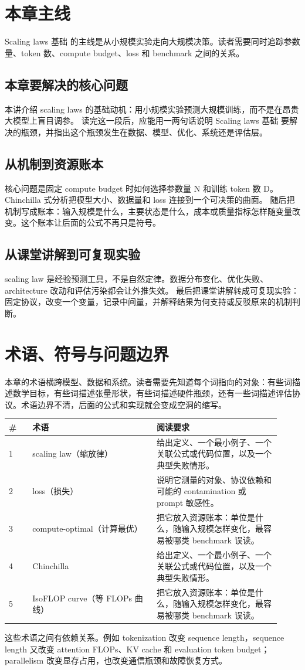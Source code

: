 \documentclass[a4paper]{article}
\begin{document}
\section{本章主线}
Scaling laws 基础 的主线是从小规模实验走向大规模决策。读者需要同时追踪参数量、token 数、compute budget、loss 和 benchmark 之间的关系。
\subsection{本章要解决的核心问题}
本讲介绍 scaling laws 的基础动机：用小规模实验预测大规模训练，而不是在昂贵大模型上盲目调参。
读完这一段后，应能用一两句话说明 Scaling laws 基础 要解决的瓶颈，并指出这个瓶颈发生在数据、模型、优化、系统还是评估层。
\subsection{从机制到资源账本}
核心问题是固定 compute budget 时如何选择参数量 N 和训练 token 数 D。Chinchilla 式分析把模型大小、数据量和 loss 连接到一个可决策的曲面。
随后把机制写成账本：输入规模是什么，主要状态是什么，成本或质量指标怎样随变量改变。这个账本让后面的公式不再只是符号。
\subsection{从课堂讲解到可复现实验}
scaling law 是经验预测工具，不是自然定律。数据分布变化、优化失败、architecture 改动和评估污染都会让外推失效。
最后把课堂讲解转成可复现实验：固定协议，改变一个变量，记录中间量，并解释结果为何支持或反驳原来的机制判断。
\section{术语、符号与问题边界}
本章的术语横跨模型、数据和系统。读者需要先知道每个词指向的对象：有些词描述数学目标，有些词描述张量形状，有些词描述硬件瓶颈，还有一些词描述评估协议。术语边界不清，后面的公式和实现就会变成空洞的缩写。
\begin{longtable}{p{0.08\linewidth}p{0.42\linewidth}p{0.42\linewidth}}
\toprule
\textbf{\#} & \textbf{术语} & \textbf{阅读要求}\\
\midrule
1 & scaling law（缩放律） & 给出定义、一个最小例子、一个关联公式或代码位置，以及一个典型失败情形。\\
2 & loss（损失） & 说明它测量的对象、协议依赖和可能的 contamination 或 prompt 敏感性。\\
3 & compute-optimal（计算最优） & 把它放入资源账本：单位是什么，随输入规模怎样变化，最容易被哪类 benchmark 误读。\\
4 & Chinchilla & 给出定义、一个最小例子、一个关联公式或代码位置，以及一个典型失败情形。\\
5 & IsoFLOP curve（等 FLOPs 曲线） & 把它放入资源账本：单位是什么，随输入规模怎样变化，最容易被哪类 benchmark 误读。\\
\bottomrule
\end{longtable}
这些术语之间有依赖关系。例如 tokenization 改变 sequence length，sequence length 又改变 attention FLOPs、KV cache 和 evaluation token budget；parallelism 改变显存占用，也改变通信瓶颈和故障恢复方式。
\end{document}
